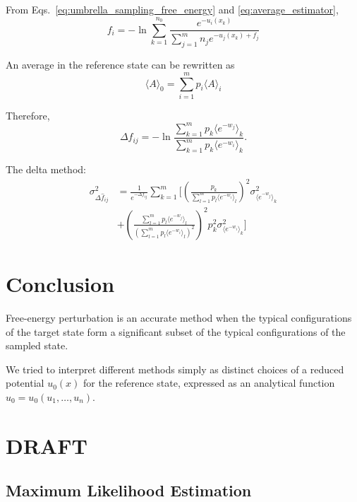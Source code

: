 \documentclass[aip,jcp,reprint,amsmath,amssymb]{revtex4-1}
\begin{document}
From Eqs.~\eqref{eq:umbrella_sampling_free_energy} and \eqref{eq:average_estimator},
\begin{equation*}
f_i = -\ln \sum_{k=1}^{n_0} \frac{e^{-u_i(x_k)}}{\sum_{j=1}^m n_j e^{-u_j(x_k) + f_j}}
\end{equation*}

An average in the reference state can be rewritten as
\begin{equation}
\label{eq:average_reference_state}
\langle A \rangle_0 = \sum_{i=1}^m p_i \langle A \rangle_i
\end{equation}

Therefore,
\begin{equation*}
\label{eq:mbar_free_energy_difference}
\Delta f_{ij} = - \ln \frac{\sum_{k=1}^m p_k \langle e^{-w_j} \rangle_k}{\sum_{k=1}^m p_k \langle e^{-w_i} \rangle_k}.
\end{equation*}

The delta method:
\begin{align*}
\sigma^2_{\Delta \hat f_{ij}} &= \frac{1}{e^{-\Delta f_{ij}}} \sum_{k=1}^m \Bigg[ \left(\frac{p_k}{\sum_{l=1}^m p_l \langle e^{-w_i} \rangle_l } \right)^2 \sigma^2_{\langle e^{-w_j} \rangle_k} \\
&+ \left( \frac{\sum_{l=1}^m p_l \langle e^{-w_j} \rangle_l}{(\sum_{l=1}^m p_l \langle e^{-w_i} \rangle_l)^2}\right)^2 p_k^2 \sigma^2_{\langle e^{-w_i} \rangle_k} \Bigg]
\end{align*}

\section{Conclusion}

Free-energy perturbation is an accurate method when the typical configurations of the target state form a significant subset of the typical configurations of the sampled state.

We tried to interpret different methods simply as distinct choices of a reduced potential $u_0(x)$ for the reference state, expressed as an analytical function $u_0 = u_0(u_1,\dots,u_n)$.

\section{DRAFT}

\subsection{Maximum Likelihood Estimation}
\end{document}
